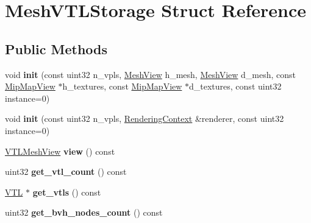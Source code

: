 \hypertarget{struct_mesh_v_t_l_storage}{}\section{Mesh\+V\+T\+L\+Storage Struct Reference}
\label{struct_mesh_v_t_l_storage}
\subsection*{Public Methods}
\begin{DoxyCompactItemize}
\item 
\mbox{\label{struct_mesh_v_t_l_storage_ab4ea898d9954c59d50f3760926e10ad1}} 
void {\bfseries init} (const uint32 n\+\_\+vpls, \hyperlink{struct_mesh_view}{Mesh\+View} h\+\_\+mesh, \hyperlink{struct_mesh_view}{Mesh\+View} d\+\_\+mesh, const \hyperlink{struct_mip_map_view}{Mip\+Map\+View} $\ast$h\+\_\+textures, const \hyperlink{struct_mip_map_view}{Mip\+Map\+View} $\ast$d\+\_\+textures, const uint32 instance=0)
\item 
\mbox{\label{struct_mesh_v_t_l_storage_a0b9984134df5944b8ca2ed7b726ef6bb}} 
void {\bfseries init} (const uint32 n\+\_\+vpls, \hyperlink{struct_rendering_context}{Rendering\+Context} \&renderer, const uint32 instance=0)
\item 
\mbox{\label{struct_mesh_v_t_l_storage_ae8e5c7e2dbac507b2e5d65e9aae7f6f1}} 
\hyperlink{struct_v_t_l_mesh_view}{V\+T\+L\+Mesh\+View} {\bfseries view} () const
\item 
\mbox{\label{struct_mesh_v_t_l_storage_afd0254ab2bcea0d94241c6dc4339dc13}} 
uint32 {\bfseries get\+\_\+vtl\+\_\+count} () const
\item 
\mbox{\label{struct_mesh_v_t_l_storage_a9116563f89dd699f4716d4e75bcd8a4f}} 
\hyperlink{struct_v_t_l}{V\+TL} $\ast$ {\bfseries get\+\_\+vtls} () const
\item 
\mbox{\label{struct_mesh_v_t_l_storage_a97153f60c52e50bb0bc12606ea4ee962}} 
uint32 {\bfseries get\+\_\+bvh\+\_\+nodes\+\_\+count} () const
\item 
\mbox{\label{struct_mesh_v_t_l_storage_a52cb95c6fedb2d6ff28acf9bad312239}} 

\end{DoxyCompactItemize}
